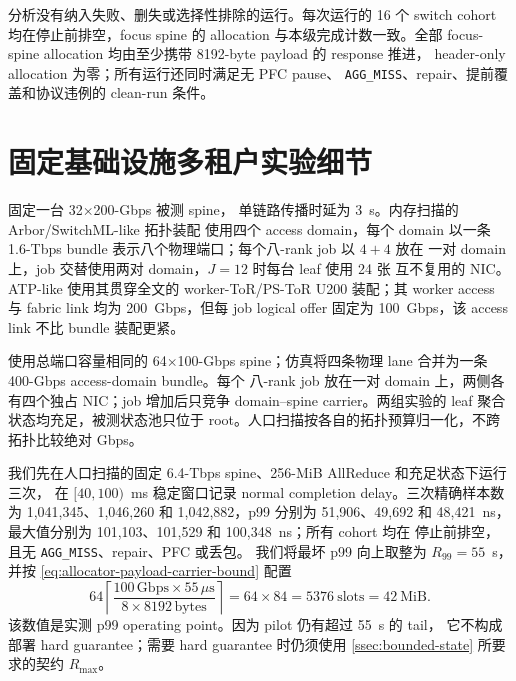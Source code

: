 分析没有纳入失败、删失或选择性排除的运行。每次运行的 16 个 switch cohort
均在停止前排空，focus spine 的 allocation 与本级完成计数一致。全部
focus-spine allocation 均由至少携带 8192-byte payload 的 response 推进，
header-only allocation 为零；所有运行还同时满足无 PFC pause、
\texttt{AGG\_MISS}、repair、提前覆盖和协议违例的 clean-run 条件。

\chapter{固定基础设施多租户实验细节}
\label{app:state-capacity}

 固定一台 32$\times$200-Gbps 被测 spine，
单链路传播时延为 3~\textmu s。内存扫描的 Arbor/SwitchML-like 拓扑装配
使用四个 access domain，每个 domain
以一条 1.6-Tbps bundle 表示八个物理端口；每个八-rank job 以 $4+4$ 放在
一对 domain 上，job 交替使用两对 domain，$J=12$ 时每台 leaf 使用 24 张
互不复用的 NIC。ATP-like 使用其贯穿全文的 worker-ToR/PS-ToR U200
装配；其 worker access 与 fabric link 均为 200~Gbps，但每 job
logical offer 固定为 100~Gbps，该 access link 不比 bundle 装配更紧。

 使用总端口容量相同的 64$\times$100-Gbps
spine；仿真将四条物理 lane 合并为一条 400-Gbps access-domain bundle。每个
八-rank job 放在一对 domain 上，两侧各有四个独占 NIC；job 增加后只竞争
domain--spine carrier。两组实验的 leaf 聚合状态均充足，被测状态池只位于
root。人口扫描按各自的拓扑预算归一化，不跨拓扑比较绝对 Gbps。

我们先在人口扫描的固定 6.4-Tbps spine、256-MiB AllReduce 和充足状态下运行
三次，
在 $[40,100)$~ms 稳定窗口记录 normal completion delay。三次精确样本数为
1,041,345、1,046,260 和 1,042,882，p99 分别为 51,906、49,692 和
48,421~ns，最大值分别为 101,103、101,529 和 100,348~ns；所有 cohort 均在
停止前排空，且无 \texttt{AGG\_MISS}、repair、PFC 或丢包。
我们将最坏 p99 向上取整为 $R_{99}=55$~\textmu s，并按
\cref{eq:allocator-payload-carrier-bound} 配置
\begin{equation}
  64\left\lceil\frac{100\,\mathrm{Gbps}\times55\,\mu\mathrm{s}}
  {8\times8192\,\mathrm{bytes}}\right\rceil
  =64\times84=5376\ \text{slots}=42\ \mathrm{MiB}.
\end{equation}
该数值是实测 p99 operating point。因为 pilot 仍有超过 55~\textmu s 的 tail，
它不构成部署 hard guarantee；需要 hard guarantee 时仍须使用
\cref{ssec:bounded-state} 所要求的契约 $R_{\max}$。

